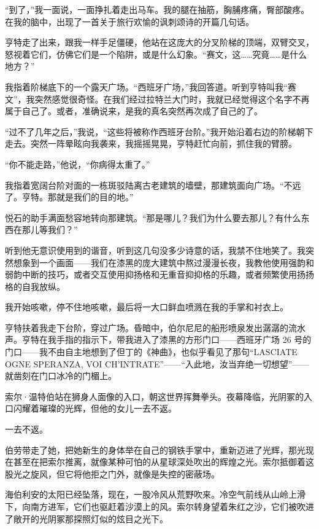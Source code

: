 \documentclass[AutoFakeBold=true]{book}
\begin{document}
``到了，''我一面说，一面挣扎着走出马车。我的腿在抽筋，胸脯疼痛，臀部酸疼。在我的脑中，出现了一首关于旅行欢愉的讽刺颂诗的开篇几句话。

亨特走了出来，跟我一样手足僵硬，他站在这庞大的分叉阶梯的顶端，双臂交叉，怒视着它们，仿佛它们是一个陷阱，或是什么幻象。``赛文，这……究竟……是什么地方？''

我指着阶梯底下的一个露天广场。``西班牙广场，''我回答道。听到亨特叫我``赛文''，我突然感觉很奇怪。在我们经过拉特兰大门时，我就已经觉得这个名字不再属于自己了。或者，准确说来，是我的真名突然再次成了自己的了。

``过不了几年之后，''我说，``这些将被称作西班牙台阶。''我开始沿着右边的阶梯朝下走去。突然一阵晕眩向我袭来，我摇摇晃晃，亨特赶忙向前，抓住我的臂膀。

``你不能走路，''他说，``你病得太重了。''

我指着宽阔台阶对面的一栋斑驳陆离古老建筑的墙壁，那建筑面向广场。``不远了。亨特。那就是我们的目的地。''

悦石的助手满面愁容地转向那建筑。``那是哪儿？我们为什么要去那儿？有什么东西在那儿等我们？''

听到他无意识使用到的谐音，听到这几句没多少诗意的话，我禁不住地笑了。我突然想象到一个画面——我们在漆黑的庞大建筑中熬过漫漫长夜，我教他使用强韵和弱韵中断的技巧，或者交互使用抑扬格和无重音抑抑格的乐趣，或者频繁使用扬扬格的自我放纵。

我开始咳嗽，停不住地咳嗽，最后将一大口鲜血喷溅在我的手掌和衬衣上。

亨特扶着我走下台阶，穿过广场。昏暗中，伯尔尼尼的船形喷泉发出潺潺的流水声。亨特在我手指的指示下，带我进入了漆黑的方形门口——西班牙广场 26 号的门口——我不由自主地想到了但丁的《神曲》，也似乎看见了那句``LASCIATE OGNE SPERANZA, VOI CH'INTRATE''——{\kaishu ``入此地，汝当弃绝一切想望''}——就凿刻在门口冰冷的门楣上。

\vspace*{1em}

索尔·温特伯站在狮身人面像的入口，朝这世界挥舞拳头。夜幕降临，光阴冢的入口闪耀着璀璨的光辉，但他的女儿一去不返。

一去不返。

伯劳带走了她，把她新生的身体举在自己的钢铁手掌中，重新迈进了光辉，那光现在甚至在把索尔推离，就像某种可怕的从星球深处吹出的辉煌之光。索尔抵御着这股光之旋风，但它将他拒之门外，就像是失控的密蔽场。

海伯利安的太阳已经坠落，现在，一股冷风从荒野吹来。冷空气前线从山岭上滑下，向南方进军，它们也驱赶着沙漠上的风。索尔转身望着朱红之沙，它们被吹进了敞开的光阴冢那探照灯似的炫目之光下。
\end{document}
